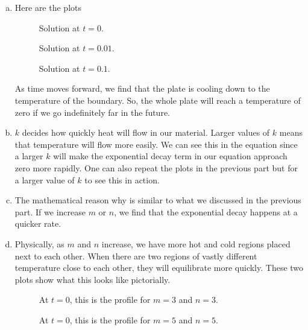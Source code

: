 \documentclass[12pt]{article} %
\begin{document}
\begin{solution}
\begin{enumerate}[(a)]
    \item Here are the plots
    \begin{figure}[H]
    	\centering
    	\def\svgwidth{0.6\columnwidth}
    	
        \caption{Solution at $t=0$.}
    \end{figure}
        \begin{figure}[H]
        	\centering
        	\def\svgwidth{0.6\columnwidth}
        	
            \caption{Solution at $t=0.01$.}
        \end{figure}
        \begin{figure}[H]
        	\centering
        	\def\svgwidth{0.6\columnwidth}
        	
            \caption{Solution at $t=0.1$.}
        \end{figure}
    As time moves forward, we find that the plate is cooling down to the temperature of the boundary.  So, the whole plate will reach a temperature of zero if we go indefinitely far in the future.
    
    \item $k$ decides how quickly heat will flow in our material. Larger values of $k$ means that temperature will flow more easily.  We can see this in the equation since a larger $k$ will make the exponential decay term in our equation approach zero more rapidly.  One can also repeat the plots in the previous part but for a larger value of $k$ to see this in action.
    
    \item The mathematical reason why is similar to what we discussed in the previous part.  If we increase $m$ or $n$, we find that the exponential decay happens at a quicker rate.
    
    \item Physically, as $m$ and $n$ increase, we have more hot and cold regions placed next to each other.  When there are two regions of vastly different temperature close to each other, they will equilibrate more quickly.  These two plots show what this looks like pictorially.
            \begin{figure}[H]
            	\centering
            	\def\svgwidth{0.6\columnwidth}
            	
                \caption{At $t=0$, this is the profile for $m=3$ and $n=3$.}
            \end{figure}
            \begin{figure}[H]
            	\centering
            	\def\svgwidth{0.6\columnwidth}
            	
                \caption{At $t=0$, this is the profile for $m=5$ and $n=5$.}
            \end{figure}
\end{enumerate}
\end{solution}
\end{document}
